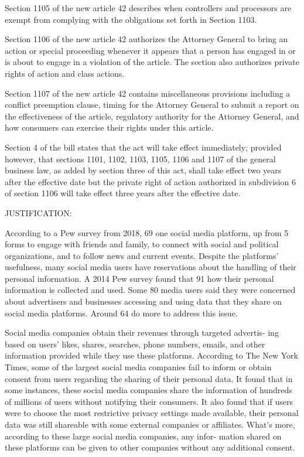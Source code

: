 Section 1105 of the new article 42 describes when controllers and
processors are exempt from complying with the obligations set forth in
Section 1103.

Section 1106 of the new article 42 authorizes the Attorney General to
bring an action or special proceeding whenever it appears that a person
has engaged in or is about to engage in a violation of the article. The
section also authorizes private rights of action and class actions.

Section 1107 of the new article 42 contains miscellaneous provisions
including a conflict preemption clause, timing for the Attorney General
to submit a report on the effectiveness of the article, regulatory
authority for the Attorney General, and how consumers can exercise their
rights under this article.

Section 4 of the bill states that the act will take effect immediately;
provided however, that sections 1101, 1102, 1103, 1105, 1106 and 1107 of
the general business law, as added by section three of this act, shall
take effect two years after the effective date but the private right of
action authorized in subdivision 6 of section 1106 will take effect
three years after the effective date.

 
JUSTIFICATION:

According to a Pew survey from 2018, 69%
one social media platform, up from 5%
forms to engage with friends and family, to connect with social and
political organizations, and to follow news and current events. Despite
the platforms' usefulness, many social media users have reservations
about the handling of their personal information. A 2014 Pew survey
found that 91%
how their personal information is collected and used. Some 80%
media users said they were concerned about advertisers and businesses
accessing and using data that they share on social media platforms.
Around 64%
do more to address this issue.

Social media companies obtain their revenues through targeted advertis-
ing based on users' likes, shares, searches, phone numbers, emails, and
other information provided while they use these platforms. According to
The New York Times, some of the largest social media companies fail to
inform or obtain consent from users regarding the sharing of their
personal data. It found that in some instances, these social media
companies share the information of hundreds of millions of users without
notifying their consumers. It also found that if users were to choose
the most restrictive privacy settings made available, their personal
data was still shareable with some external companies or affiliates.
What's more, according to these large social media companies, any infor-
mation shared on these platforms can be given to other companies without
any additional consent.

